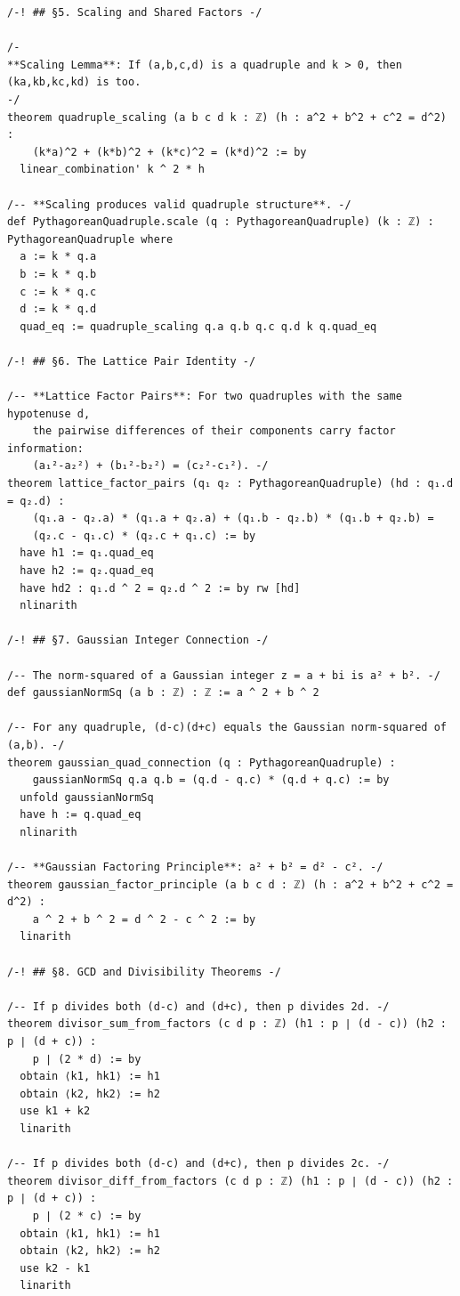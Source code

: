 \documentclass[11pt,openany]{book}
\theoremstyle{definition}
\theoremstyle{plain}
\theoremstyle{remark}
\begin{document}
\begin{lstlisting}[style=lean]
/-! ## §5. Scaling and Shared Factors -/

/-
**Scaling Lemma**: If (a,b,c,d) is a quadruple and k > 0, then (ka,kb,kc,kd) is too.
-/
theorem quadruple_scaling (a b c d k : ℤ) (h : a^2 + b^2 + c^2 = d^2) :
    (k*a)^2 + (k*b)^2 + (k*c)^2 = (k*d)^2 := by
  linear_combination' k ^ 2 * h

/-- **Scaling produces valid quadruple structure**. -/
def PythagoreanQuadruple.scale (q : PythagoreanQuadruple) (k : ℤ) : PythagoreanQuadruple where
  a := k * q.a
  b := k * q.b
  c := k * q.c
  d := k * q.d
  quad_eq := quadruple_scaling q.a q.b q.c q.d k q.quad_eq

/-! ## §6. The Lattice Pair Identity -/

/-- **Lattice Factor Pairs**: For two quadruples with the same hypotenuse d,
    the pairwise differences of their components carry factor information:
    (a₁²-a₂²) + (b₁²-b₂²) = (c₂²-c₁²). -/
theorem lattice_factor_pairs (q₁ q₂ : PythagoreanQuadruple) (hd : q₁.d = q₂.d) :
    (q₁.a - q₂.a) * (q₁.a + q₂.a) + (q₁.b - q₂.b) * (q₁.b + q₂.b) =
    (q₂.c - q₁.c) * (q₂.c + q₁.c) := by
  have h1 := q₁.quad_eq
  have h2 := q₂.quad_eq
  have hd2 : q₁.d ^ 2 = q₂.d ^ 2 := by rw [hd]
  nlinarith

/-! ## §7. Gaussian Integer Connection -/

/-- The norm-squared of a Gaussian integer z = a + bi is a² + b². -/
def gaussianNormSq (a b : ℤ) : ℤ := a ^ 2 + b ^ 2

/-- For any quadruple, (d-c)(d+c) equals the Gaussian norm-squared of (a,b). -/
theorem gaussian_quad_connection (q : PythagoreanQuadruple) :
    gaussianNormSq q.a q.b = (q.d - q.c) * (q.d + q.c) := by
  unfold gaussianNormSq
  have h := q.quad_eq
  nlinarith

/-- **Gaussian Factoring Principle**: a² + b² = d² - c². -/
theorem gaussian_factor_principle (a b c d : ℤ) (h : a^2 + b^2 + c^2 = d^2) :
    a ^ 2 + b ^ 2 = d ^ 2 - c ^ 2 := by
  linarith

/-! ## §8. GCD and Divisibility Theorems -/

/-- If p divides both (d-c) and (d+c), then p divides 2d. -/
theorem divisor_sum_from_factors (c d p : ℤ) (h1 : p ∣ (d - c)) (h2 : p ∣ (d + c)) :
    p ∣ (2 * d) := by
  obtain ⟨k1, hk1⟩ := h1
  obtain ⟨k2, hk2⟩ := h2
  use k1 + k2
  linarith

/-- If p divides both (d-c) and (d+c), then p divides 2c. -/
theorem divisor_diff_from_factors (c d p : ℤ) (h1 : p ∣ (d - c)) (h2 : p ∣ (d + c)) :
    p ∣ (2 * c) := by
  obtain ⟨k1, hk1⟩ := h1
  obtain ⟨k2, hk2⟩ := h2
  use k2 - k1
  linarith


\end{lstlisting}
\end{document}
